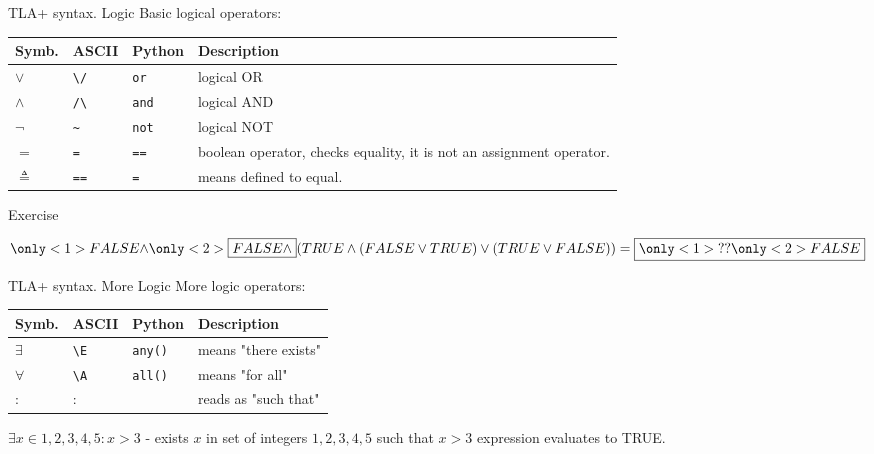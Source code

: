 \documentclass[12pt]{beamer}
\begin{document}
  \begin{frame}{TLA+ syntax. Logic}
      Basic logical operators:
        \begin{table}
        \centering
            \begin{tabular}{@{} lllp{7cm} @{}}
                Symb.         & ASCII                       & Python & Description   \\ \hline
                $\lor$        & \texttt{\textbackslash /}   & \texttt{or} &logical OR \\
                $\land$       & \texttt{/\textbackslash}   & \texttt{and} &logical AND \\
                $\lnot$       & \texttt{\~}                  & \texttt{not} &logical NOT \\
                $=$           & \texttt{=}                  & \texttt{==} & boolean operator, checks equality, it is not an assignment operator. \\
                $\triangleq$  & \texttt{==}                 & \texttt{=} & means defined to equal.

            \end{tabular}
        \end{table}
  \end{frame}
  \begin{frame}{Exercise}
    \begin{center}
        $ \only<1>{FALSE \land}\only<2>{\boxed{FALSE \land}} (TRUE \land (FALSE \lor TRUE) \lor (TRUE \lor FALSE)) =  \boxed{\only<1>{??}\only<2>{FALSE}}$
    \end{center}
  \end{frame}
  \begin{frame}{TLA+ syntax. More Logic}
      More logic operators:
        \begin{table}
        \centering
            \begin{tabular}{@{} lllp{7cm} @{}}
                Symb.     & ASCII                     & Python                     & Description   \\ \hline
                $\exists$ & \texttt{\textbackslash E} & \texttt{any()} & means "there exists"\\
                $\forall$ & \texttt{\textbackslash A} & \texttt{all()} & means "for all"\\
                $:$       & $:$                       &                            & reads as "such that"
            \end{tabular}
        \end{table}

      $\exists x \in {1,2,3,4,5} : x > 3$ - exists $x$ in
      set of integers ${1,2,3,4,5}$ such that $x > 3$ expression evaluates
      to TRUE.
  \end{frame}
\end{document}
